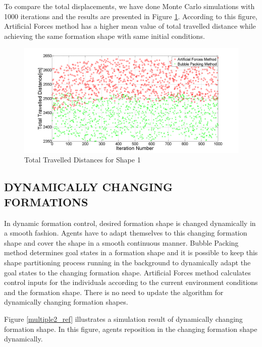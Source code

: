 \documentclass[letterpaper, 10 pt, conference]{ieeeconf}  %
\begin{document}
To compare the total displacements, we have done Monte Carlo simulations with 1000 iterations and the results are presented in Figure \ref{total_disp_1}. According to this figure, Artificial Forces method has a higher mean value of total travelled distance while achieving the same formation shape with same initial conditions.
		
\begin{figure}[thpb]
\caption{Total Travelled Distances for Shape 1} \label{total_disp_1}
\centerline{\includegraphics[scale = 0.18]{Total_Energy_Shape_1}}
\end{figure}

\subsection{DYNAMICALLY CHANGING FORMATIONS} \label{dynamical_ref}
In dynamic formation control, desired formation shape is changed dynamically in a smooth fashion. Agents have to adapt themselves to this changing formation shape and cover the shape in a smooth continuous manner. Bubble Packing method determines goal states in a formation shape and it is possible to keep this shape partitioning process running in the background to dynamically adapt the goal states to the changing formation shape. Artificial Forces method calculates control inputs for the individuals according to the current environment conditions and the formation shape. There is no need to update the algorithm for dynamically changing formation shapes.

Figure \ref{multiple2_ref} illustrates a simulation result of dynamically changing formation shape. In this figure, agents reposition in the changing formation shape dynamically. 
\end{document}
